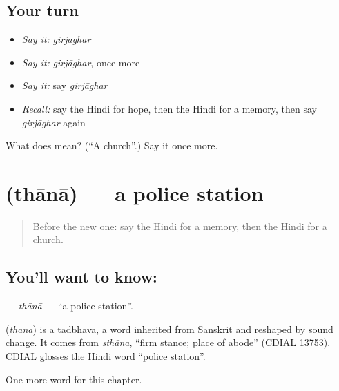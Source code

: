 \subsection*{Your turn}
\begin{itemize}
\raggedright
  \item \emph{Say it:} \emph{girjāghar}
  \item \emph{Say it:} \emph{girjāghar}, once more
  \item \emph{Say it:} say \emph{girjāghar}
  \item \emph{Recall:} say the Hindi for hope, then the Hindi for a memory, then say \emph{girjāghar} again
\end{itemize}

\begin{tcolorbox}[breakable,colback=teal!4,colframe=teal!35!black,title={Before you move on}]
What does  mean? (\textquotedblleft{}A church\textquotedblright{}.) Say it once more.
\end{tcolorbox}
\section[\texorpdfstring{\hi{थाना} (thānā)}{थाना (thānā)}]{ (thānā) — a police station}

\label{lesson:HI-C187-thana}



\begin{quote}
Before the new one: say the Hindi for a memory, then the Hindi for a church.
\end{quote}

\subsection*{You'll want to know: }
\textbf{} — \emph{thānā} — \textquotedblleft{}a police station\textquotedblright{}.

\begin{cousinweb}
\textbf{} (\emph{thānā}) is a tadbhava, a word inherited from Sanskrit and reshaped by sound change. It comes from \emph{sthāna}, \textquotedblleft{}firm stance; place of abode\textquotedblright{} (CDIAL 13753). CDIAL glosses the Hindi word \textquotedblleft{}police station\textquotedblright{}.
\end{cousinweb}

\begin{grammarlens}[title={What you've built}]
One more word for this chapter.
\end{grammarlens}

